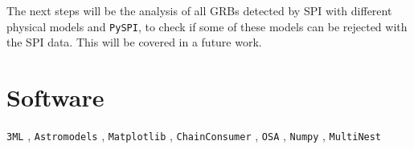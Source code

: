 \documentclass[twocolumn]{aa}
\begin{document}
The next steps will be the analysis of all GRBs detected by SPI with different physical models and {\tt PySPI}, to check if some of these models can be rejected with the SPI data. This will be covered in a future work.

\section*{Software}

{\tt 3ML} \citep{3ML}, {\tt Astromodels} \citep{astromodels}, {\tt Matplotlib} \citep{matplotlib}, {\tt ChainConsumer} \citep{chainconsumer}, {\tt OSA} \citep{osa}, {\tt Numpy} \citep{numpy}, {\tt MultiNest} \citep{multinest1, multinest2, multinest3}
\end{document}

